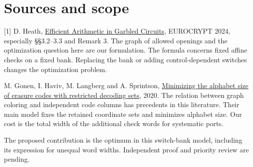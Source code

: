 \documentclass[11pt]{article}
\begin{document}
\section*{Sources and scope}
[1] D. Heath, \href{https://doi.org/10.1007/978-3-031-58740-5_1}{Efficient Arithmetic in Garbled Circuits}, EUROCRYPT 2024, especially \S\S3.2--3.3 and Remark 3. The graph of allowed openings and the optimization question here are our formulation. The formula concerns fixed affine checks on a fixed bank. Replacing the bank or adding control-dependent switches changes the optimization problem.\par
[2] M. Gonen, I. Haviv, M. Langberg and A. Sprintson, \href{https://arxiv.org/abs/2005.06947}{Minimizing the alphabet size of erasure codes with restricted decoding sets}, 2020. The relation between graph coloring and independent code columns has precedents in this literature. Their main model fixes the retained coordinate sets and minimizes alphabet size. Our cost is the total width of the additional check words for systematic ports.\par\medskip
The proposed contribution is the optimum in this switch-bank model, including its expression for unequal word widths. Independent proof and priority review are pending.
\end{document}
